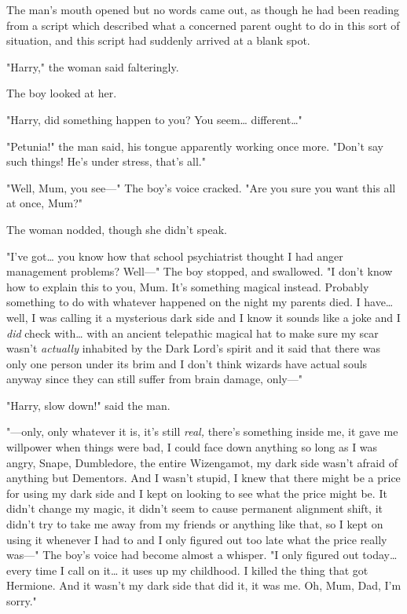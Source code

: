 The man's mouth opened but no words came out, as though he had been reading
from a script which described what a concerned parent ought to do in this sort
of situation, and this script had suddenly arrived at a blank spot.

"Harry," the woman said falteringly.

The boy looked at her.

"Harry, did something happen to you? You seem{\ldots} different{\ldots}"

"Petunia!" the man said, his tongue apparently working once more. "Don't say
such things! He's under stress, that's all."

"Well, Mum, you see---" The boy's voice cracked. "Are you sure you want this
all at once, Mum?"

The woman nodded, though she didn't speak.

"I've got{\ldots} you know how that school psychiatrist thought I had anger
management problems? Well---" The boy stopped, and swallowed. "I don't know how
to explain this to you, Mum. It's something magical instead. Probably something
to do with whatever happened on the night my parents died. I have{\ldots} well,
I was calling it a mysterious dark side and I know it sounds like a joke and I
\emph{did} check with{\ldots} with an ancient telepathic magical hat to make
sure my scar wasn't \emph{actually} inhabited by the Dark Lord's spirit and it
said that there was only one person under its brim and I don't think wizards
have actual souls anyway since they can still suffer from brain damage, only---"

"Harry, slow down!" said the man.

"---only, only whatever it is, it's still \emph{real,} there's something inside
me, it gave me willpower when things were bad, I could face down anything so
long as I was angry, Snape, Dumbledore, the entire Wizengamot, my dark side
wasn't afraid of anything but Dementors. And I wasn't stupid, I knew that there
might be a price for using my dark side and I kept on looking to see what the
price might be. It didn't change my magic, it didn't seem to cause permanent
alignment shift, it didn't try to take me away from my friends or anything like
that, so I kept on using it whenever I had to and I only figured out too late
what the price really was---" The boy's voice had become almost a whisper. "I
only figured out today{\ldots} every time I call on it{\ldots} it uses up my
childhood. I killed the thing that got Hermione. And it wasn't my dark side
that did it, it was me. Oh, Mum, Dad, I'm sorry."

